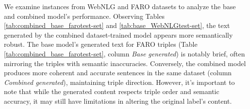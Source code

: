 \documentclass[
]{ceurart}
\begin{document}
\begin{sidewaystable}[ph!]
\end{sidewaystable}

We examine instances from WebNLG and FARO datasets to analyze the base and combined model's performance. Observing Tables \ref{tab:combined_base_farotest-set} and \ref{tab:base_WebNLGtest-set}, the text generated by the combined dataset-trained model appears more semantically robust. The base model's generated text for FARO triples (Table \ref{tab:combined_base_farotest-set}, column \textit{Base generated}) is notably brief, often mirroring the triples with semantic inaccuracies. Conversely, the combined model produces more coherent and accurate sentences in the same dataset (column \textit{Combined generated}), maintaining triple direction. However, it's important to note that while the generated content respects triple order and semantic accuracy, it may still have limitations in altering the original label's content.
\end{document}
